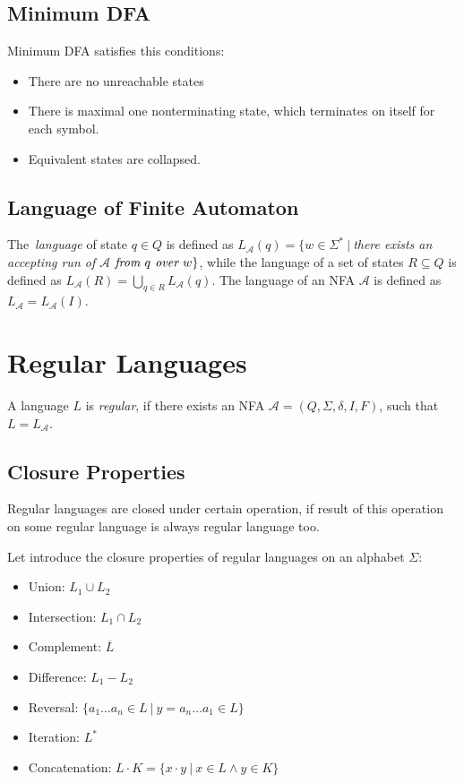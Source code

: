 	\subsection{Minimum DFA}
	\label{defMinDFA}
	\begin{definition}
		Minimum DFA satisfies this conditions:
		\begin{itemize}
			\item There are no unreachable states
			\item There is maximal one nonterminating state, which terminates on itself for each symbol.
			\item Equivalent states are collapsed.
		\end{itemize}
	\end{definition}


  \subsection{Language of Finite Automaton}
  The~\emph{language} of state $q \in Q$ is defined as 
  $L_\mathcal{A}(q) = \{w\in \Sigma^{*}\ |\ $\emph{there exists an accepting run of }$
  \mathcal{A}$$ 
  \emph{ from }q\emph{ over }w\}$, while the language of a set of states $R\subseteq Q$ is defined as $L_{\mathcal{A}}(R)=\bigcup_{q\in R}L_{\mathcal{A}}(q)$.
  The language of an NFA $\mathcal{A}$ is defined as $L_{\mathcal{A}}=L_{\mathcal{A}}(I)$.

\section{Regular Languages}
		A language $L$ is \emph{regular}, if there exists an NFA $\mathcal{A}=(Q,\Sigma,\delta,I,F)$, such that $L=L_\mathcal{A}$.

    \subsection{Closure Properties}
    Regular languages are closed under certain operation, if result of this operation on some regular language is always regular language too.

		Let introduce the closure properties of regular languages on an alphabet $\Sigma$:
		\begin{itemize}
			\item Union:  $L_1 \cup L_2$%
			\item Intersection:  $L_1 \cap L_2$%
			\item Complement: $\overline{L}$%
			\item Difference: $L_1-L_2$%
			\item Reversal: $\{a_1\dots a_n \in L \ |\ y=a_n\dots a_1 \in L\}$
			\item Iteration: $L^{*}$ %
			\item Concatenation: $L\cdot K=\{x \cdot y\ |\ x\in L \wedge y\in K\}$
		\end{itemize}

